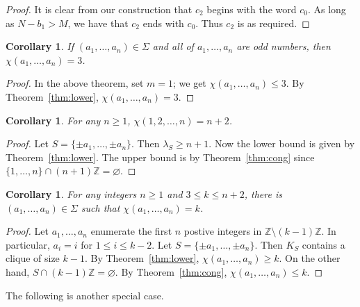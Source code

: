 \documentclass[11pt]{amsart}
\newtheorem{corollary}[theorem]{Corollary}
\theoremstyle{definition}
\def\Z{\mathbb{Z}}
\def\Z{\mathbb{Z}}
\begin{document}
\begin{proof}
It is clear from our construction that $c_2$ begins with the word $c_0$. As long as $N-b_1>M$, we have that $c_2$ ends with $c_0$. Thus $c_2$ is as required. 
\end{proof}

\begin{corollary}\label{cor:odd} If $(a_1, \dots, a_n)\in \Sigma$ and all of $a_1, \dots, a_n$ are odd numbers, then $\chi(a_1,\dots, a_n)=3$.
\end{corollary}
\begin{proof} In the above theorem, set $m=1$; we get $\chi(a_1,\dots, a_n)\leq 3$. By Theorem~\ref{thm:lower}, $\chi(a_1,\dots, a_n)=3$.
\end{proof}

\begin{corollary}\label{cor:1ton} For any $n\geq 1$, $\chi(1, 2,\dots, n)=n+2$.
\end{corollary}

\begin{proof} Let $S=\{\pm a_1, \dots, \pm a_n\}$. Then $\lambda_S\geq n+1$. Now the lower bound is given by Theorem~\ref{thm:lower}. The upper bound is by Theorem~\ref{thm:cong} since $\{1, \dots, n\}\cap (n+1)\Z=\varnothing$.
\end{proof}

\begin{corollary} For any integers $n\geq 1$ and $3\leq k\leq n+2$, there is $(a_1,\dots, a_n)\in \Sigma$ such that $\chi(a_1,\dots, a_n)=k$.
\end{corollary}

\begin{proof} Let $a_1, \dots, a_n$ enumerate the first $n$ postive integers in $\Z\setminus (k-1)\Z$. In particular, $a_i=i$ for $1\leq i\leq k-2$. Let $S=\{\pm a_1, \dots, \pm a_n\}$. Then $K_S$ contains a clique of size $k-1$. By Theorem~\ref{thm:lower}, $\chi(a_1,\dots, a_n)\geq k$. On the other hand, $S\cap (k-1)\Z=\varnothing$. By Theorem~\ref{thm:cong}, $\chi(a_1,\dots, a_n)\leq k$.
\end{proof}

The following is another special case. 
\end{document}
